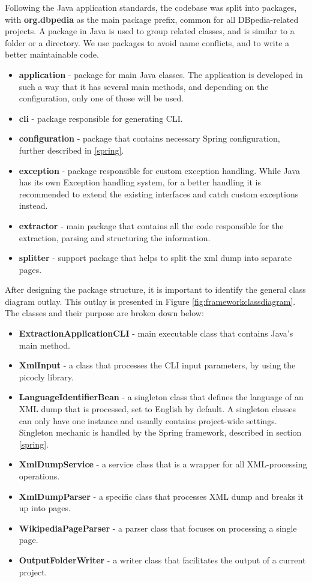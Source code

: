 \documentclass[thesis=M,english,hidelinks]{FITthesis}[2019/12/23]
\begin{document}
Following the Java application standards, the codebase was split into packages, with \textbf{org.dbpedia} as the main package prefix, common for all DBpedia-related projects. A package in Java is used to group related classes, and is similar to a folder or a directory. We use packages to avoid name conflicts, and to write a better maintainable code.

\begin{itemize}
	\item \textbf{application} - package for main Java classes. The application is developed in such a way that it has several main methods, and depending on the configuration, only one of those will be used.
	\item \textbf{cli} - package responsible for generating \gls{CLI}.
	\item \textbf{configuration} - package that contains necessary Spring configuration, further described in \ref{spring}.
	\item \textbf{exception} - package responsible for custom exception handling. While Java has its own Exception handling system, for a better handling it is recommended to extend the existing interfaces and catch custom exceptions instead.
	\item \textbf{extractor} - main package that contains all the code responsible for the extraction, parsing and structuring the information.
	\item \textbf{splitter} - support package that helps to split the xml dump into separate pages.
\end{itemize}

After designing the package structure, it is important to identify the general class diagram outlay. This outlay is presented in Figure \ref{fig:frameworkclassdiagram}. The classes and their purpose are broken down below:

\begin{itemize}
	\item \textbf{ExtractionApplicationCLI} - main executable class that contains Java's main method.
	\item \textbf{XmlInput} - a class that processes the \gls{CLI} input parameters, by using the picocly library\cite{picocli_library}.
	\item \textbf{LanguageIdentifierBean} - a singleton class that defines the language of an XML dump that is processed, set to English by default. A singleton classes can only have one instance and usually contains project-wide settings. Singleton mechanic is handled by the Spring framework, described in section \ref{spring}.
	\item \textbf{XmlDumpService} -  a service class that is a wrapper for all XML-processing operations.
	\item \textbf{XmlDumpParser} - a specific class that processes XML dump and breaks it up into pages.
	\item \textbf{WikipediaPageParser} - a parser class that focuses on processing a single page.
	\item \textbf{OutputFolderWriter} - a writer class that facilitates the output of a current project.
\end{itemize}
\end{document}
